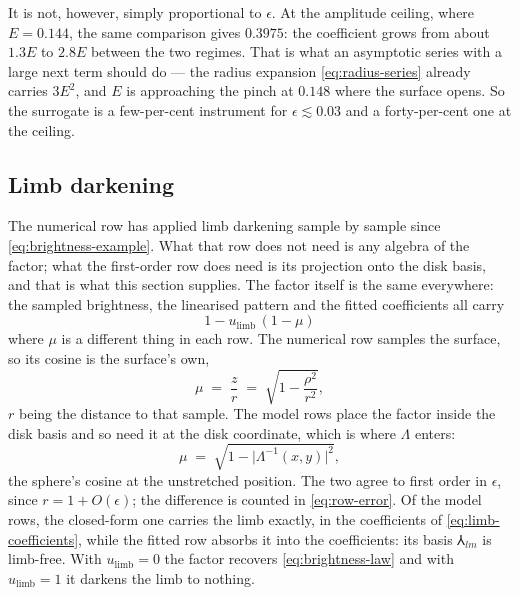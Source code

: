 It is not, however, simply proportional to $\epsilon$.  At the amplitude ceiling, where
$E = 0.144$, the same comparison gives $0.3975$: the coefficient grows from about $1.3E$ to
$2.8E$ between the two regimes.  That is what an asymptotic series with a large next term
should do --- the radius expansion \eqref{eq:radius-series} already carries $3E^2$, and $E$
is approaching the pinch at $0.148$ where the surface opens.  So the surrogate is a
few-per-cent instrument for $\epsilon \lesssim 0.03$ and a forty-per-cent one at the ceiling.

\subsection{Limb darkening}
\label{sec:deformation-brightness}

The numerical row has applied limb darkening sample by sample since
\eqref{eq:brightness-example}.  What that row does not need is any algebra of the factor; what the
first-order row does need is its projection onto the disk basis, and that is what this section
supplies.  The factor itself is the same everywhere: the sampled brightness, the linearised
pattern and the fitted coefficients all carry
\begin{equation}
  1 - u_\text{limb}\,(1-\mu)
  \label{eq:limb-factor}
\end{equation}
where $\mu$ is a different thing in each row.  The numerical row samples the surface, so its
cosine is the surface's own,
\begin{equation}
  \mu \;=\; \frac{z}{r} \;=\; \sqrt{1 - \frac{\rho^{2}}{r^{2}}} ,
  \label{eq:limb-cosine}
\end{equation}
$r$ being the distance to that sample.  The model rows place the factor inside the disk basis and so need it at the disk coordinate, which is where $\Lambda$ enters:
\begin{equation}
  \mu \;=\; \sqrt{1 - \bigl|\Lambda^{-1}(x,y)\bigr|^{2}} ,
  \label{eq:model-cosine}
\end{equation}
the sphere's cosine at the unstretched position.  The two agree to first order in $\epsilon$,
since $r = 1 + O(\epsilon)$; the difference is counted in \eqref{eq:row-error}.  Of the model rows,
the closed-form one carries the limb exactly, in the coefficients of \eqref{eq:limb-coefficients},
while the fitted row absorbs it into the coefficients: its basis $\Yup_{lm}$ is limb-free.  With $u_\text{limb} = 0$ the factor recovers
\eqref{eq:brightness-law} and with $u_\text{limb} = 1$ it darkens the limb to nothing.

